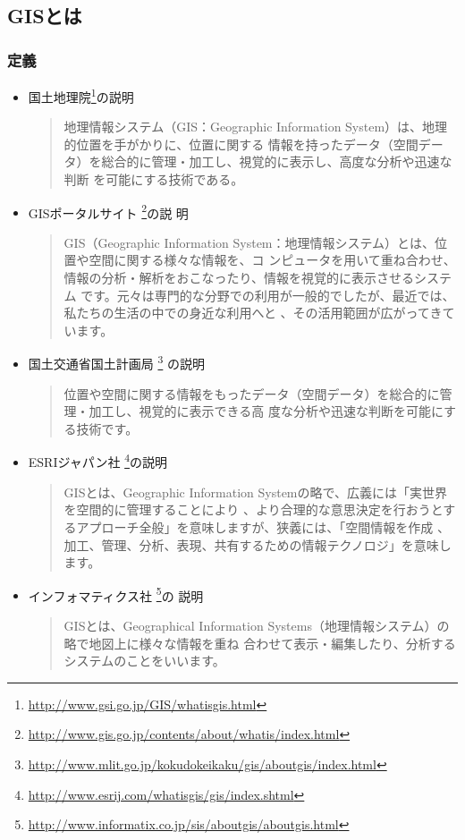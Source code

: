 \documentclass[mingoth,a4paper]{jsarticle}
\begin{document}
\subsection{GISとは}
\subsubsection{定義}
\begin{itemize}
 \item 国土地理院\footnote{\url{http://www.gsi.go.jp/GIS/whatisgis.html}}の説明
       \begin{quotation}
	地理情報システム（GIS：Geographic Information System）は、地理的位置を手がかりに、位置に関する
	情報を持ったデータ（空間データ）を総合的に管理・加工し、視覚的に表示し、高度な分析や迅速な判断
	を可能にする技術である。 
       \end{quotation}
 \item GISポータルサイト
       \footnote{\url{http://www.gis.go.jp/contents/about/whatis/index.html}}の説
       明
       \begin{quotation}
	GIS（Geographic Information System：地理情報システム）とは、位置や空間に関する様々な情報を、コ
	ンピュータを用いて重ね合わせ、情報の分析・解析をおこなったり、情報を視覚的に表示させるシステム
	です。元々は専門的な分野での利用が一般的でしたが、最近では、私たちの生活の中での身近な利用へと
	、その活用範囲が広がってきています。 
       \end{quotation}
 \item 国土交通省国土計画局
       \footnote{\url{http://www.mlit.go.jp/kokudokeikaku/gis/aboutgis/index.html}}
       の説明
       \begin{quotation}
	位置や空間に関する情報をもったデータ（空間データ）を総合的に管理・加工し、視覚的に表示できる高
	度な分析や迅速な判断を可能にする技術です。 
       \end{quotation}
 \item ESRIジャパン社
       \footnote{\url{http://www.esrij.com/whatisgis/gis/index.shtml}}の説明
       \begin{quotation}
	GISとは、Geographic Information Systemの略で、広義には「実世界を空間的に管理することにより
	、より合理的な意思決定を行おうとするアプローチ全般」を意味しますが、狭義には、「空間情報を作成
	、加工、管理、分析、表現、共有するための情報テクノロジ」を意味します。 
       \end{quotation}
 \item インフォマティクス社
       \footnote{\url{http://www.informatix.co.jp/sis/aboutgis/aboutgis.html}}の
       説明
       \begin{quotation}
	GISとは、Geographical Information Systems（地理情報システム）の略で地図上に様々な情報を重ね
	合わせて表示・編集したり、分析するシステムのことをいいます。
       \end{quotation}
\end{itemize}
\end{document}
